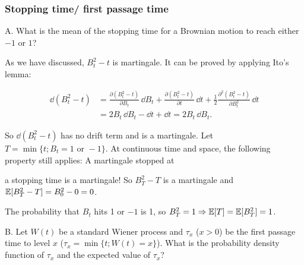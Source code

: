 \subsubsection*{Stopping time/ first passage time}

\begin{problem}{A. What is the mean of the stopping time for a Brownian motion to reach either
$-1$ or $1$?}
\end{problem}

\begin{solution}
As we have discussed, $B_t^2-t$ is martingale. It can be proved by applying Ito's
lemma:

\[
\begin{aligned}
\dd(B_t^2-t)
 &=\frac{\partial(B_t^2-t)}{\partial B_t}\,\dd B_t
   +\frac{\partial(B_t^2-t)}{\partial t}\,\dd t
   +\frac{1}{2}\frac{\partial^2(B_t^2-t)}{\partial B_t^2}\,\dd t\\
 &=2B_t\,\dd B_t-\dd t+\dd t=2B_t\,\dd B_t.
\end{aligned}
\]

So $\dd(B_t^2-t)$ has no drift term and is a martingale. Let
$T=\min\{t;B_t=1\text{ or }-1\}$. At continuous time and space, the following
property still applies: A martingale stopped at


a stopping time is a martingale! So $B_T^2-T$ is a martingale and
$\mathbb{E}[B_T^2-T]=B_0^2-0=0$.

The probability that $B_t$ hits 1 or $-1$ is 1, so $B_T^2=1\Rightarrow
\mathbb{E}[T]=\mathbb{E}[B_T^2]=1$.

\end{solution}

\begin{problem}{B. Let $W(t)$ be a standard Wiener process and $\tau_x$ ($x>0$) be the first
passage time to level $x$ ($\tau_x=\min\{t;W(t)=x\}$). What is the probability density
function of $\tau_x$ and the expected value of $\tau_x$?}
\end{problem}

